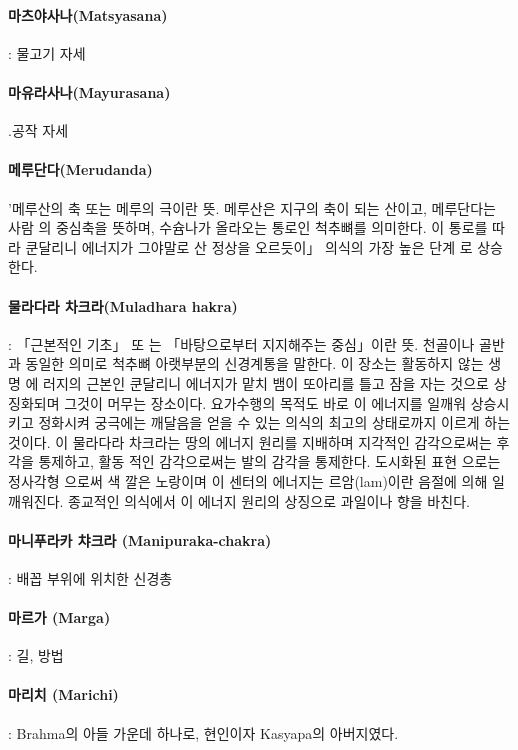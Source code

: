\documentclass[12pt, a4paper, oneside]{book}
\begin{document}
\paragraph{마츠야사나(Matsyasana)} : 물고기 자세

\paragraph{마유라사나(Mayurasana)} .공작 자세

\paragraph{메루단다(Merudanda)} '메루산의 축 또는 메루의 극이란 뜻. 메루산은 지구의 축이 되는 산이고, 메루단다는 사람 의 중심축을 뜻하며, 수슘나가 올라오는 통로인 척추뼈를 의미한다. 이 통로를 따라 쿤달리니 에너지가 그야말로 산 정상을 오르듯이」 의식의 가장 높은 단계 로 상승한다.

\paragraph{물라다라 차크라(Muladhara hakra)} : 「근본적인 기초」 또 는 「바탕으로부터 지지해주는 중심」이란 뜻. 천골이나 골반과 동일한 의미로 척추뼈 아랫부분의 신경계통을 말한다. 이 장소는 활동하지 않는 생 명 에 러지의 근본인 쿤달리니 에너지가 맡치 뱀이 또아리를 틀고 잠을 자는 것으로 상징화되며 그것이 머무는 장소이다. 요가수행의 목적도 바로 이 에너지를 일깨워 상승시키고 정화시켜 궁극에는 깨달음을 얻을 수 있는 의식의 최고의 상태로까지 이르게 하는 것이다. 이 물라다라 차크라는 땅의 에너지 원리를 지배하며 지각적인 감각으로써는 후각을 통제하고, 활동 적인 감각으로써는 발의 감각을 통제한다. 도시화된 표현    으로는 정사각형 으로써 색 깔은 노랑이며 이 센터의 에너지는 르암(lam)이란 음절에 의해 일깨워진다. 종교적인 의식에서 이 에너지 원리의 상징으로 과일이나 향을 바친다.

\paragraph{마니푸라카 챠크라 (Manipuraka-chakra)} : 배꼽 부위에 위치한 신경총

\paragraph{마르가 (Marga)} : 길, 방법

\paragraph{마리치 (Marichi)} : Brahma의 아들 가운데 하나로, 현인이자 Kasyapa의 아버지였다.
\end{document}
